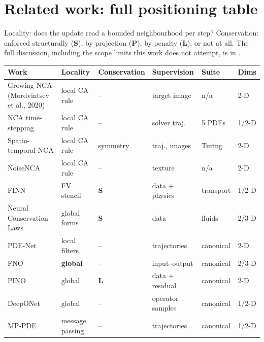 
\section{Related work: full positioning table}\label{app:related}

Locality: does the update read a bounded neighbourhood per step? Conservation: enforced
structurally (\textbf{S}), by projection (\textbf{P}), by penalty (\textbf{L}), or not at
all. The full discussion, including the scope limits this work does not attempt, is in
.

\begin{table}[h]
\centering
\small
\begin{tabular}{llllll}
\toprule
Work & Locality & Conservation & Supervision & Suite & Dims \\
\midrule
Growing NCA (Mordvintsev et al., 2020) & local CA rule & -- & target image & n/a & 2-D \\
NCA time-stepping \citep{saha2026nca} & local CA rule & -- & solver traj. & 5 PDEs & 1/2-D \\
Spatio-temporal NCA \citep{richardson2023nca} & local CA rule & symmetry & traj., images & Turing & 2-D \\
NoiseNCA \citep{pajouheshgar2024noisenca} & local CA rule & -- & texture & n/a & 2-D \\
FINN \citep{praditia2021finn,karlbauer2022composing} & FV stencil & \textbf{S} & data + physics & transport & 1/2-D \\
Neural Conservation Laws \citep{richterpowell2022ncl} & global forms & \textbf{S} & data & fluids & 2/3-D \\
PDE-Net \citep{long2018pdenet,long2019pdenet2} & local filters & -- & trajectories & canonical & 2-D \\
FNO \citep{li2021fno} & \textbf{global} & -- & input--output & canonical & 2/3-D \\
PINO \citep{li2021pino} & global & \textbf{L} & data + residual & canonical & 2-D \\
DeepONet \citep{lu2021deeponet} & global & -- & operator samples & canonical & 1/2-D \\
MP-PDE \citep{brandstetter2022mppde} & message passing & -- & trajectories & canonical & 1/2-D \\

\end{tabular}
\end{table}
